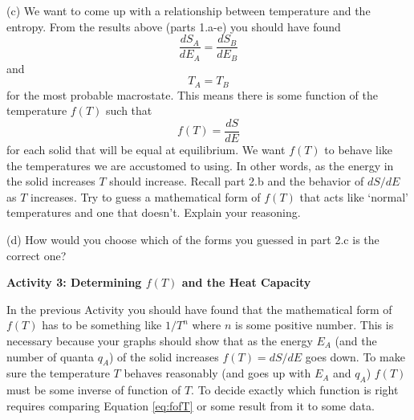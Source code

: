 (c) We want to come up with a relationship between temperature and the entropy.
From the results above (parts 1.a-e) you should have found
\begin{equation}
\frac{dS_A}{dE_A} = \frac{dS_B}{dE_B}
\end{equation}
and
\begin{equation}
T_A = T_B
\end{equation}
for the most probable macrostate.
This means there is some function of the temperature $f(T)$ such that
\begin{equation}\label{eq:fofT}
f(T) = \frac{dS}{dE}
\end{equation}
for each solid that will be equal at equilibrium.
We want $f(T)$ to behave like the temperatures we are accustomed to using.
In other words, as the energy in the solid increases $T$ should increase.
Recall part 2.b and the behavior of $dS/dE$ as $T$ increases.
Try to guess a mathematical form of $f(T)$ that acts like `normal' temperatures
and one that doesn't. Explain your reasoning.
\vspace{30mm}

(d) How would you choose which of the forms you guessed in part 2.c is the correct one?
\vspace{15mm}

\textbf{Activity 3: Determining $f(T)$ and the Heat Capacity}

In the previous Activity you should have found that the mathematical form of $f(T)$
has to be something like $1/T^n$ where $n$ is some positive number.
This is necessary because your graphs should show that as the energy $E_A$ (and the number
of quanta $q_A$) of the solid 
increases $f(T)=dS/dE$ goes down. To make sure the temperature $T$ behaves reasonably
(and goes up with $E_A$ and $q_A$) $f(T)$ must be some inverse of function of $T$.
To decide exactly which function is right requires comparing Equation \ref{eq:fofT} or some
result from it to some data.

